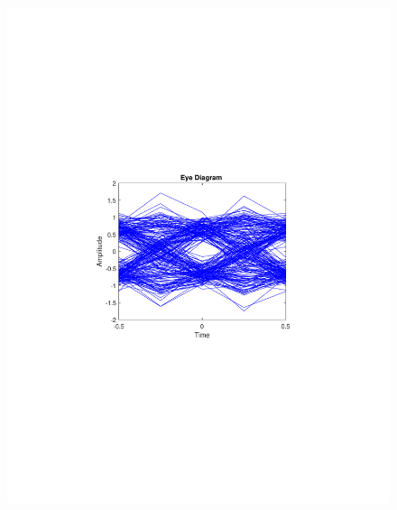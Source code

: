 \begin{refsection}
\begin{figure}[H]
\begin{minipage}{0.30\textwidth}
		\includegraphics[clip, trim=4cm 8cm 4cm 8cm, width=1\textwidth]{./sdf/m_qam_system/figures/expResults/intradyne/6_eye_16GBdInSig13dB_AfMIMO2.pdf}
		\label{fig:16GBdSpecMIMO2}
	\end{minipage}
	\begin{minipage}{0.30\textwidth}
		\centering

\end{minipage}
\end{figure}
\end{refsection}
